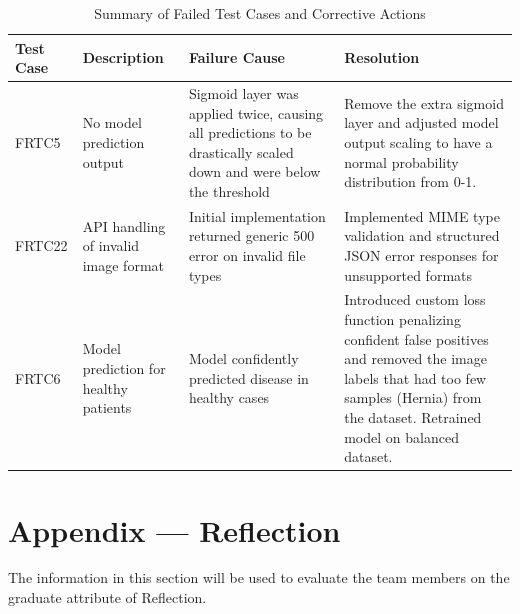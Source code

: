 \documentclass[12pt, titlepage]{article}
\begin{document}
\begin{table}[h!]
\centering
\begin{tabular}{|p{2cm}|p{3cm}|p{4cm}|p{4.5cm}|}
\hline
\textbf{Test Case} & \textbf{Description} & \textbf{Failure Cause} & \textbf{Resolution} \\
\hline
FRTC5 & No model prediction output & Sigmoid layer was applied twice, causing all predictions to be drastically scaled down and were below the threshold & Remove the extra sigmoid layer and adjusted model output scaling to have a normal probability distribution from 0-1. \\
\hline
FRTC22 & API handling of invalid image format & Initial implementation returned generic 500 error on invalid file types & Implemented MIME type validation and structured JSON error responses for unsupported formats \\
\hline
FRTC6 & Model prediction for healthy patients & Model confidently predicted disease in healthy cases & Introduced custom loss function penalizing confident false positives and removed the image labels that had too few samples (Hernia) from the dataset. Retrained model on balanced dataset. \\
\hline
\end{tabular}
\caption{Summary of Failed Test Cases and Corrective Actions}
\label{tab:failed-tests}
\end{table}



\section*{Appendix --- Reflection}

The information in this section will be used to evaluate the team members on the
graduate attribute of Reflection.


\end{document}
